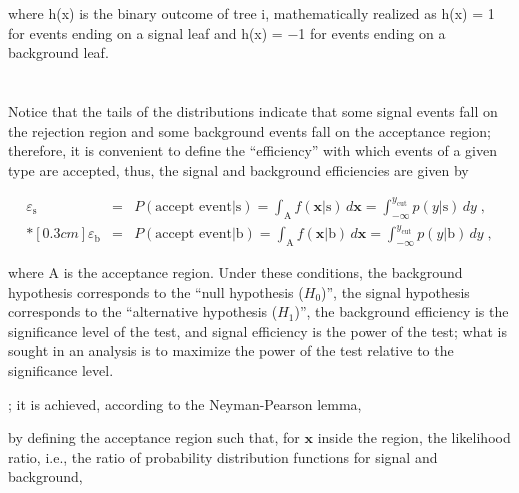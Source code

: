 where h(x) is the binary outcome of tree i, mathematically realized as h(x) = 1 for events
ending on a signal leaf and h(x) = −1 for events ending on a background leaf.















\section{} 




 Notice that the tails of the distributions indicate that some signal events fall on the rejection region and some background events fall on the acceptance region; therefore, it is convenient to define the ``efficiency'' with which events of a given type are accepted, thus, the signal and background efficiencies are given by 

\begin{eqnarray}
\label{eq:sigeff}
\varepsilon_{\textrm{s}} & = & P( \mbox{accept event} | \mbox{s} ) = \int_{\textrm{A}} f(\textbf{x} | \mbox{s} ) \, d \textbf{x} = \int_{-\infty}^{y_{\textrm{cut}}} p(y | \mbox{s}) \, dy\;, \\*[0.3 cm]
\varepsilon_{\textrm{b}} & = & P( \mbox{accept event} | \mbox{b} ) = \int_{\textrm{A}} f(\textbf{x} | \mbox{b} ) \, d \textbf{x} = \int_{-\infty}^{y_{\textrm{cut}}} p(y | \mbox{b}) \, dy \;,
\end{eqnarray}

where A is the acceptance region. Under these conditions, the background hypothesis corresponds to the ``null hypothesis ($H_0$)'', the signal hypothesis corresponds to the ``alternative hypothesis ($H_1$)'', the background efficiency is the significance level of the test, and signal efficiency is the power of the test; what is sought in an analysis is to maximize the power of the test relative to the significance level.








; it is achieved, according to the Neyman-Pearson lemma\cite{npl},






by defining the acceptance region such that, for $\textbf{x}$ inside the region, the likelihood ratio, i.e., the ratio of probability distribution functions for signal and background,







